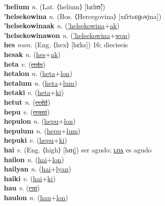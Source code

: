 \textbf{'helium} \textit{n.} (Lat. ⟨helium⟩ [hɛlɪʊ̃])
 \label{'helium} \\
\textbf{'helsekowina} \textit{n.} (Bos. ⟨Hercegovina⟩ [xɛ̌rtsɛɡov̞ina])
 \label{'helsekowina} \\
\textbf{'helsekowinaak} \textit{n.} (\hyperref['helsekowina]{'helsekowina}+\hyperref[ak]{ak})
 \label{'helsekowinaak} \\
\textbf{'helsekowinawon} \textit{n.} (\hyperref['helsekowina]{'helsekowina}+\hyperref[won]{won})
 \label{'helsekowinawon} \\
\textbf{hes} \textit{num.} (Eng. ⟨hex⟩ [hɛks])
16; dieciseis \label{hes} \\
\textbf{hesak} \textit{n.} (\hyperref[hes]{hes}+\hyperref[ak]{ak})
 \label{hesak} \\
\textbf{heta} \textit{v.} (\hyperref[cola]{\sout{cola}})
 \label{heta} \\
\textbf{hetalon} \textit{n.} (\hyperref[heta]{heta}+\hyperref[lon]{lon})
 \label{hetalon} \\
\textbf{hetalum} \textit{n.} (\hyperref[heta]{heta}+\hyperref[lum]{lum})
 \label{hetalum} \\
\textbf{hetaki} \textit{v.} (\hyperref[heta]{heta}+\hyperref[ki]{ki})
 \label{hetaki} \\
\textbf{hetut} \textit{n.} (\hyperref[colil]{\sout{colil}})
 \label{hetut} \\
\textbf{hepu} \textit{v.} (\hyperref[comi]{\sout{comi}})
 \label{hepu} \\
\textbf{hepulon} \textit{n.} (\hyperref[hepu]{hepu}+\hyperref[lon]{lon})
 \label{hepulon} \\
\textbf{hepulum} \textit{n.} (\hyperref[hepu]{hepu}+\hyperref[lum]{lum})
 \label{hepulum} \\
\textbf{hepuki} \textit{v.} (\hyperref[hepu]{hepu}+\hyperref[ki]{ki})
 \label{hepuki} \\
\textbf{hai} \textit{v.} (Eng. ⟨high⟩ [hɑɪ̯])
ser agudo; \hyperref[hailon]{ʟᴏᴧ} es agudo \label{hai} \\
\textbf{hailon} \textit{n.} (\hyperref[hai]{hai}+\hyperref[lon]{lon})
 \label{hailon} \\
\textbf{hailyan} \textit{n.} (\hyperref[hai]{hai}+\hyperref[lyan]{lyan})
 \label{hailyan} \\
\textbf{haiki} \textit{v.} (\hyperref[hai]{hai}+\hyperref[ki]{ki})
 \label{haiki} \\
\textbf{hau} \textit{v.} (\hyperref[cai]{\sout{cai}})
 \label{hau} \\
\textbf{haulon} \textit{n.} (\hyperref[hau]{hau}+\hyperref[lon]{lon})
